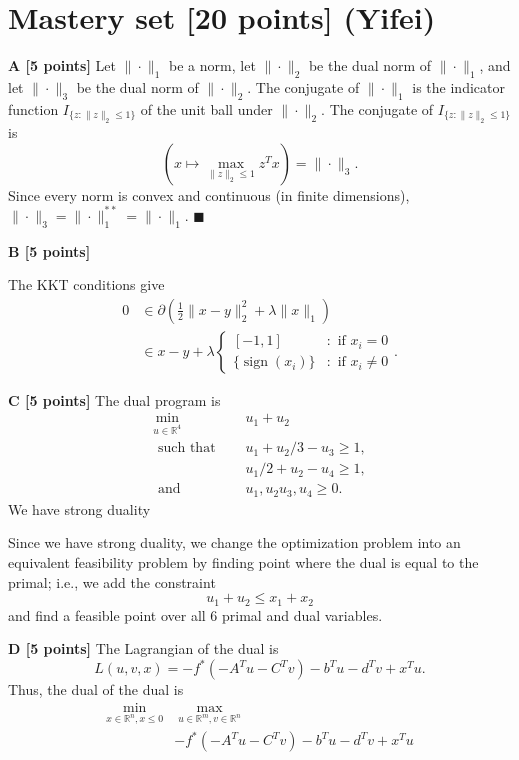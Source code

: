 \documentclass[11pt]{article}
\newcommand{\R}{\mathbb{R}}
\renewcommand{\qed}{\quad \ensuremath{\blacksquare}}
\newcommand{\sgn}{{\operatorname{sign}}}
\begin{document}
\twocolumn

\section{Mastery set [20 points] (Yifei)}

\textbf{A [5 points]}
Let $\|\cdot\|_1$ be a norm, let $\|\cdot\|_2$ be the
dual norm of $\|\cdot\|_1$, and let $\|\cdot\|_3$ be the dual norm of
$\|\cdot\|_2$. The conjugate of $\|\cdot\|_1$ is the indicator function
$I_{\{z : \|z\|_2 \leq 1\}}$ of the unit ball under $\|\cdot\|_2$. The
conjugate of $I_{\{z : \|z\|_2 \leq 1\}}$ is
\[\left(x \mapsto \max_{\|z\|_2 \leq 1}z^Tx \right) = \|\cdot\|_3.\]
Since every norm is convex and continuous (in finite dimensions),
$\|\cdot\|_3 = \|\cdot\|_1^{**} = \|\cdot\|_1$. \qed

\textbf{B [5 points]}

The KKT conditions give
\begin{align*}
0
 &  \in \partial \left( \frac{1}{2}\|x - y\|_2^2 + \lambda \|x\|_1 \right)  \\
 &  \in x - y + \lambda \left\{
        \begin{array}{ll}
            [-1,1]              & : \mbox{ if } x_i = 0      \\
            \{\sgn(x_i)\}   & : \mbox{ if } x_i \neq 0
        \end{array}
    \right..
\end{align*}

\textbf{C [5 points]} The dual program is
\begin{align*}
\min_{u \in \R^4} \quad &   u_1 + u_2         \\
\mbox{ such that } \quad
                        &   u_1 + u_2/3 - u_3   \geq 1, \\
                        &   u_1/2 + u_2  - u_4  \geq 1, \\
\mbox{ and } \quad
                        &   u_1, u_2 u_3, u_4   \geq 0.
\end{align*}
We have strong duality



Since we have strong duality, we change the optimization problem into an
equivalent feasibility problem by finding point where the dual is equal to the
primal; i.e., we add the constraint
\[u_1 + u_2 \leq x_1 + x_2\]
and find a feasible point over all $6$ primal and dual variables.

\textbf{D [5 points]} The Lagrangian of the dual is
\[L(u,v,x) = -f^*(-A^Tu - C^Tv) - b^Tu - d^Tv + x^Tu.\]
Thus, the dual of the dual is
\begin{align*}
\min_{x \in \R^n, x \leq 0} & \; \max_{u \in \R^m, v \in \R^n}   \\
                            &        -f^*(-A^Tu - C^Tv) - b^Tu - d^Tv + x^Tu \\
\end{align*}
\end{document}

